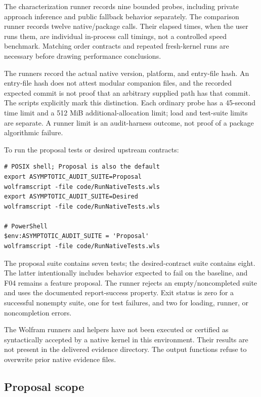The characterization runner records nine bounded probes, including private approach inference and public fallback behavior separately. The comparison runner records twelve native/package calls. Their elapsed times, when the user runs them, are individual in-process call timings, not a controlled speed benchmark. Matching order contracts and repeated fresh-kernel runs are necessary before drawing performance conclusions.

The runners record the actual native version, platform, and entry-file hash. An entry-file hash does not attest modular companion files, and the recorded expected commit is not proof that an arbitrary supplied path has that commit. The scripts explicitly mark this distinction. Each ordinary probe has a 45-second time limit and a 512 MiB additional-allocation limit; load and test-suite limits are separate. A runner limit is an audit-harness outcome, not proof of a package algorithmic failure.

To run the proposal tests or desired upstream contracts:
\begin{lstlisting}
# POSIX shell; Proposal is also the default
export ASYMPTOTIC_AUDIT_SUITE=Proposal
wolframscript -file code/RunNativeTests.wls
export ASYMPTOTIC_AUDIT_SUITE=Desired
wolframscript -file code/RunNativeTests.wls

# PowerShell
$env:ASYMPTOTIC_AUDIT_SUITE = 'Proposal'
wolframscript -file code/RunNativeTests.wls
\end{lstlisting}
The proposal suite contains seven tests; the desired-contract suite contains eight. The latter intentionally includes behavior expected to fail on the baseline, and F04 remains a feature proposal. The runner rejects an empty/noncompleted suite and uses the documented report-success property. Exit status is zero for a successful nonempty suite, one for test failures, and two for loading, runner, or noncompletion errors.\cite{wl-testreport}

The Wolfram runners and helpers have not been executed or certified as syntactically accepted by a native kernel in this environment. Their results are not present in the delivered evidence directory. The output functions refuse to overwrite prior native evidence files.

\subsection{Proposal scope}

